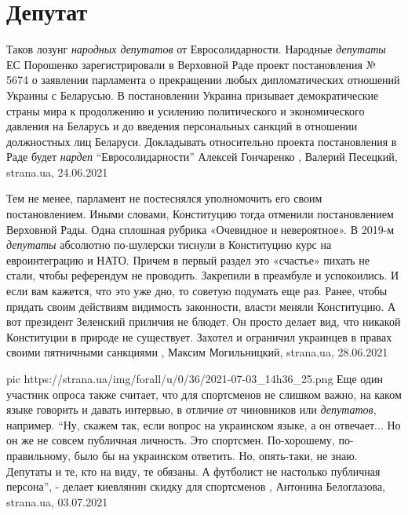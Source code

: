  
 
 
 
 
\chapter{Депутат}
\label{sec:slova.deputat}

Таков лозунг \emph{народных депутатов} от Евросолидарности.  Народные
\emph{депутаты} ЕС Порошенко зарегистрировали в Верховной Раде проект
постановления № 5674 о заявлении парламента о прекращении любых дипломатических
отношений Украины с Беларусью. В постановлении Украина призывает
демократические страны мира к продолжению и усилению политического и
экономического давления на Беларусь и до введения персональных санкций в
отношении должностных лиц Беларуси. Докладывать относительно проекта
постановления в Раде будет \emph{нардеп} \enquote{Евросолидарности} Алексей
Гончаренко
, 
Валерий Песецкий, strana.ua, 24.06.2021

Тем не менее, парламент не постеснялся уполномочить его своим постановлением.
Иными словами, Конституцию тогда отменили постановлением Верховной Рады. Одна
сплошная рубрика «Очевидное и невероятное».  В 2019-м \emph{депутаты} абсолютно
по-шулерски тиснули в Конституцию курс на евроинтеграцию и НАТО. Причем в
первый раздел это «счастье» пихать не стали, чтобы референдум не проводить.
Закрепили в преамбуле и успокоились.  И если вам кажется, что это уже дно, то
советую подумать еще раз. Ранее, чтобы придать своим действиям видимость
законности, власти меняли Конституцию. А вот президент Зеленский приличия не
блюдет. Он просто делает вид, что никакой Конституции в природе не существует.
Захотел и ограничил украинцев в правах своими пятничными санкциями
, 
Максим Могильницкий, strana.ua, 28.06.2021

\ifcmt
  pic https://strana.ua/img/forall/u/0/36/2021-07-03_14h36_25.png
\fi
Еще один участник опроса также считает, что для спортсменов не слишком важно,
на каком языке говорить и давать интервью, в отличие от чиновников или
\emph{депутатов}, например.  \enquote{Ну, скажем так, если вопрос на украинском
языке, а он отвечает... Но он же не совсем публичная личность. Это спортсмен.
По-хорошему, по-правильному, было бы на украинском ответить. Но, опять-таки, не
знаю. Депутаты и те, кто на виду, те обязаны. А футболист не настолько
публичная персона}, - делает киевлянин скидку для спортсменов
, 
Антонина Белоглазова, strana.ua, 03.07.2021
